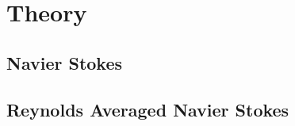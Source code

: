 \section{Theory}
\label{theory}
\subsection{Navier Stokes}
\subsection{Reynolds Averaged Navier Stokes}

